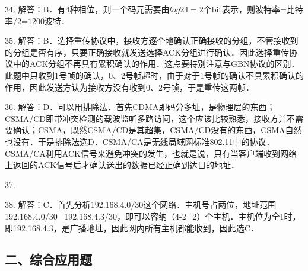 34. 解答：B．有$4$种相位，则一个码元需要由$log24=2$个bit表示，则波特率=比特率/$2$=$1200$波特．

35. 解答：B．选择重传协议中，接收方逐个地确认正确接收的分组，不管接收到的分组是否有序，只要正确接收就发送选择ACK分组进行确认．因此选择重传协议中的ACK分组不再具有累积确认的作用．这点要特别注意与GBN协议的区别．此题中只收到1号帧的确认，0、2号帧超时，由于对于1号帧的确认不具累积确认的作用，因此发送方认为接收方没有收到0、2号帧，于是重传这两帧．

36. 解答：D．可以用排除法．首先CDMA即码分多址，是物理层的东西；CSMA/CD即带冲突检测的载波监听多路访问，这个应该比较熟悉，接收方并不需要确认；CSMA，既然CSMA/CD是其超集，CSMA/CD没有的东西，CSMA自然也没有．于是排除法选D．CSMA/CA是无线局域网标准802.11中的协议．CSMA/CA利用ACK信号来避免冲突的发生，也就是说，只有当客户端收到网络上返回的ACK信号后才确认送出的数据已经正确到达目的地址．

37. 

38. 解答：C．首先分析192.168.4.0/30这个网络．主机号占两位，地址范围192.168.4.0/30~ 192.168.4.3/30，即可以容纳（4-2=2）个主机．主机位为全1时，即192.168.4.3，是广播地址，因此网内所有主机都能收到，因此选C．


\subsection{二、综合应用题}
